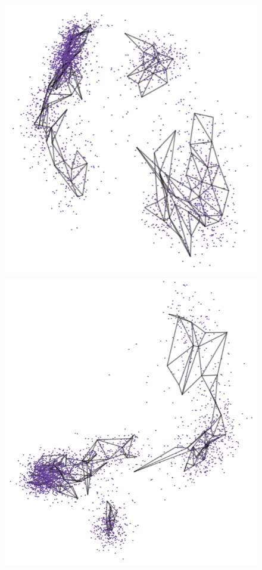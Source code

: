 \documentclass[
  12pt]{article}
\begin{document}
\begin{figure}[H]
\begin{minipage}{0.25\linewidth}
\includegraphics{figures/pbmc3k/sc_1.png}\end{minipage}%
%
\begin{minipage}{0.25\linewidth}
\includegraphics{figures/pbmc3k/sc_2.png}\end{minipage}%

\end{figure}
\end{document}
